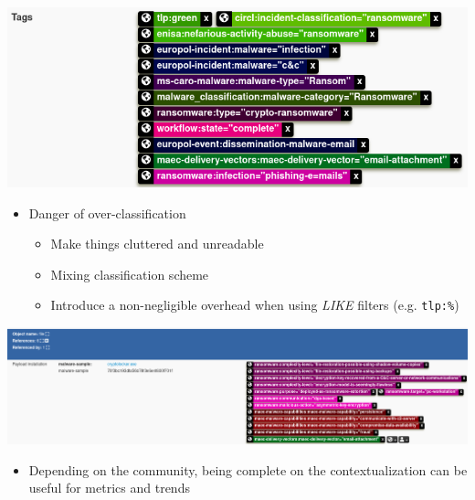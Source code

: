 \begin{frame}
    \includegraphics[width=1.0\linewidth]{pictures/case2/event-tags.png}
    \vspace{0.25cm}
    \begin{itemize}
        \item Danger of over-classification
        \begin{itemize}
            \item Make things cluttered and unreadable
            \item Mixing classification scheme
            \item Introduce a non-negligible overhead when using \textit{LIKE} filters (e.g. \texttt{tlp:\%})
        \end{itemize}
    \end{itemize}
\end{frame}

\begin{frame}
    \includegraphics[width=1.0\linewidth]{pictures/case2/attribute-tags1.png}
    \vspace{0.25cm}
    \begin{itemize}
        \item Depending on the community, being complete on the contextualization can be useful for metrics and trends
    \end{itemize}
\end{frame}

